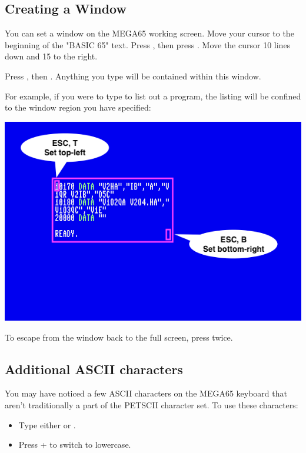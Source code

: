 \subsection{Creating a Window}

You can set a window on the MEGA65 working screen. Move your cursor to the beginning of the "BASIC 65" text. Press , then press . Move the cursor 10 lines down and 15 to the right.

Press , then . Anything you type will be contained within this window.

For example, if you were to type  to list out a program, the listing will be confined to the window region you have specified:

\begin{center}
\includegraphics[width=0.7\linewidth]{images/set-window.png}
\end{center}

To escape from the window back to the full screen, press  twice.

\subsection{Additional ASCII characters}

You may have noticed a few ASCII characters on the MEGA65 keyboard that aren't traditionally a part of the PETSCII character set. To use these characters:

\begin{itemize}
  \item Type either  or .
  \item Press \megasymbolkey +  to switch to lowercase.
\end{itemize}

